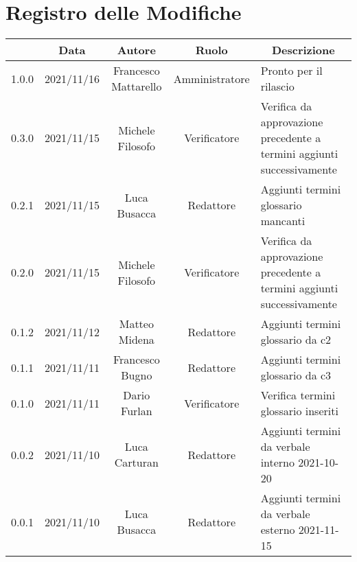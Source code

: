 \thispagestyle{empty}
\section*{Registro delle Modifiche}

\begin{center}
	\renewcommand{\arraystretch}{1.8}
	\begin{longtable}[c]{c | c | c | c | p{5cm}}
		\rowcolor[HTML]{125E28}
		\multicolumn{1}{c}{\color[HTML]{FFFFFF} \textbf{Versione}} & 
		\multicolumn{1}{c}{\color[HTML]{FFFFFF} \textbf{Data}} & 
		\multicolumn{1}{c}{\color[HTML]{FFFFFF} \textbf{Autore}} & 
		\multicolumn{1}{c}{\color[HTML]{FFFFFF} \textbf{Ruolo}} & 
		\multicolumn{1}{c}{\color[HTML]{FFFFFF} \textbf{Descrizione}} \\
		\endhead
		1.0.0 & 2021/11/16 & Francesco Mattarello & Amministratore & Pronto per il rilascio\\
		0.3.0 & 2021/11/15 & Michele Filosofo & Verificatore & Verifica da approvazione precedente a termini aggiunti successivamente\\
		0.2.1 & 2021/11/15 & Luca Busacca & Redattore & Aggiunti termini glossario mancanti\\
		0.2.0 & 2021/11/15 & Michele Filosofo & Verificatore & Verifica da approvazione precedente a termini aggiunti successivamente\\
		0.1.2 & 2021/11/12 & Matteo Midena & Redattore & Aggiunti termini glossario da c2\\
		0.1.1 & 2021/11/11 & Francesco Bugno & Redattore & Aggiunti termini glossario da c3\\
		0.1.0 & 2021/11/11 & Dario Furlan & Verificatore & Verifica termini glossario inseriti\\
		0.0.2 & 2021/11/10 & Luca Carturan & Redattore & Aggiunti termini da verbale interno 2021-10-20\\
		0.0.1 & 2021/11/10 & Luca Busacca & Redattore & Aggiunti termini da verbale esterno 2021-11-15\\

	\end{longtable}
\end{center}